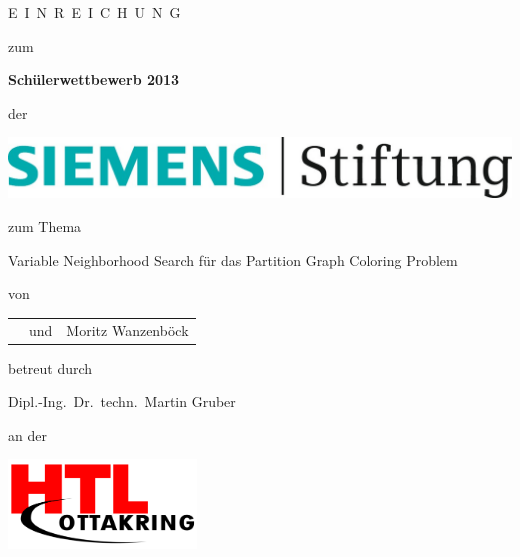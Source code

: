 \documentclass[paper=a4,fontsize=12pt]{scrartcl}
\begin{document}
\begin{titlepage}
\begin{center}
\vspace*{\fill}
{\Large E}\ {\large I\ N\ R\ E\ I\ C\ H\ U\ N\ G}

\vspace{5mm}

zum

\vspace{5mm}

{\Large\bfseries Schülerwettbewerb 2013}

\vspace{5mm}

der

\vspace{5mm}

\includegraphics{siemens.jpg}

\vspace{5mm}

zum Thema

\vspace{5mm}

{\Huge Variable Neighborhood Search für das Partition Graph Coloring Problem}

\vspace{5mm}

von

\vspace{5mm}

\begin{tabular}{>{\raggedright\arraybackslash}p{}c>{\raggedleft\arraybackslash}p{}}
{\large Lorenz Leutgeb} & und & {\large Moritz Wanzenböck} \\
\end{tabular}

\vspace{5mm}

betreut durch

\vspace{5mm}

{\large Dipl.-Ing.\ Dr.\ techn.\ Martin Gruber}

\vspace{5mm}

an der

\vspace{5mm}

\includegraphics[width=5cm]{../img/htl.png}

\vspace*{\fill}
\end{center}
\end{titlepage}
\end{document}
